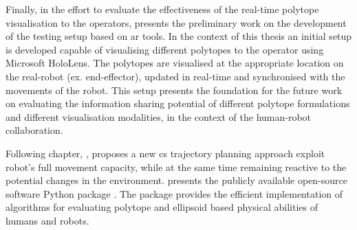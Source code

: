 Finally, in the effort to evaluate the effectiveness of the real-time polytope visualisation to the operators, 
 presents the preliminary work on the development of the testing setup based on \gls{ar} tools. In the context of this thesis an initial setup is developed capable of visualising different polytopes to the operator using Microsoft HoloLens. The polytopes are visualised at the appropriate location on the real-robot (ex. end-effector), updated in real-time and synchronised with the movements of the robot. This setup presents the foundation for the future work on evaluating the information sharing potential of different polytope formulations and different visualisation modalities, in the context of the human-robot collaboration.


Following chapter, , proposes a new \gls{cs} trajectory planning approach exploit robot's full movement capacity, while at the same time remaining reactive to the potential changes in the environment. 
 presents the publicly available open-source software Python package . The package provides the efficient implementation of algorithms for evaluating polytope and ellipsoid based physical abilities of humans and robots.
